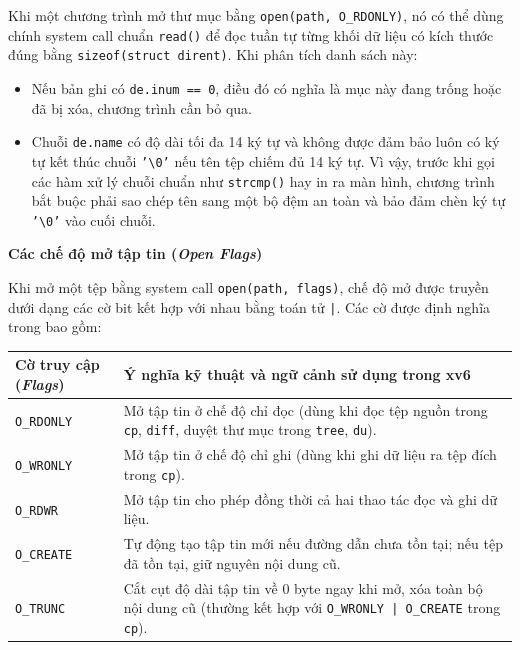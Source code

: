 \documentclass[12pt,a4paper]{article}
\begin{document}
Khi một chương trình mở thư mục bằng \texttt{open(path, O\_RDONLY)}, nó có thể dùng chính system call chuẩn \texttt{read()} để đọc tuần tự từng khối dữ liệu có kích thước đúng bằng \texttt{sizeof(struct dirent)}. Khi phân tích danh sách này:
\begin{itemize}
  \item Nếu bản ghi có \texttt{de.inum == 0}, điều đó có nghĩa là mục này đang trống hoặc đã bị xóa, chương trình cần bỏ qua.
  \item Chuỗi \texttt{de.name} có độ dài tối đa 14 ký tự và không được đảm bảo luôn có ký tự kết thúc chuỗi \texttt{'\textbackslash 0'} nếu tên tệp chiếm đủ 14 ký tự. Vì vậy, trước khi gọi các hàm xử lý chuỗi chuẩn như \texttt{strcmp()} hay in ra màn hình, chương trình bắt buộc phải sao chép tên sang một bộ đệm an toàn và bảo đảm chèn ký tự \texttt{'\textbackslash 0'} vào cuối chuỗi.
\end{itemize}

\textbf{Các chế độ mở tập tin (\textit{Open Flags})}

Khi mở một tệp bằng system call \texttt{open(path, flags)}, chế độ mở được truyền dưới dạng các cờ bit kết hợp với nhau bằng toán tử \texttt{|}. Các cờ được định nghĩa trong  bao gồm:

\begin{center}
\small
\renewcommand{\arraystretch}{1.2}
\begin{tabularx}{\textwidth}{@{}l X@{}}
\toprule
\rowcolor{tableheader}
\textbf{Cờ truy cập (\textit{Flags})} & \textbf{Ý nghĩa kỹ thuật và ngữ cảnh sử dụng trong xv6} \\
\midrule
\texttt{O\_RDONLY} & Mở tập tin ở chế độ chỉ đọc (dùng khi đọc tệp nguồn trong \texttt{cp}, \texttt{diff}, duyệt thư mục trong \texttt{tree}, \texttt{du}). \\
\texttt{O\_WRONLY} & Mở tập tin ở chế độ chỉ ghi (dùng khi ghi dữ liệu ra tệp đích trong \texttt{cp}). \\
\texttt{O\_RDWR} & Mở tập tin cho phép đồng thời cả hai thao tác đọc và ghi dữ liệu. \\
\texttt{O\_CREATE} & Tự động tạo tập tin mới nếu đường dẫn chưa tồn tại; nếu tệp đã tồn tại, giữ nguyên nội dung cũ. \\
\texttt{O\_TRUNC} & Cắt cụt độ dài tập tin về 0 byte ngay khi mở, xóa toàn bộ nội dung cũ (thường kết hợp với \texttt{O\_WRONLY | O\_CREATE} trong \texttt{cp}). \\
\bottomrule
\end{tabularx}
\end{center}
\end{document}
